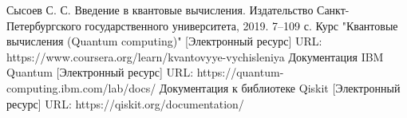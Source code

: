 \begin{thebibliography}{99}
Сысоев С. С. Введение в квантовые вычисления. Издательство Санкт-Петербургского государственного университета, 2019. 7–109 с.
Курс "Квантовые вычисления (Quantum computing)" [Электронный ресурс] URL: https://www.coursera.org/learn/kvantovyye-vychisleniya
Документация IBM Quantum [Электронный ресурс] URL: https://quantum-computing.ibm.com/lab/docs/
Документация к библиотеке Qiskit [Электронный ресурс] URL: https://qiskit.org/documentation/
\end{thebibliography}

\newpage